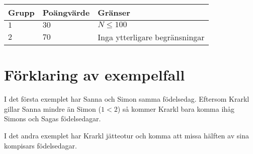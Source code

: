 \noindent
\begin{tabular}{| l | l | l |}
\hline
Grupp & Poängvärde & Gränser \\ \hline
$1$    & $30$         & $N \leq 100$ \\ \hline
$2$    & $70$         & Inga ytterligare begränsningar \\ \hline
\end{tabular}

\section*{Förklaring av exempelfall}
I det första exemplet har Sanna och Simon samma födelsedag.
Eftersom Krarkl gillar Sanna mindre än Simon ($1 < 2$) så kommer Krarkl bara komma ihåg Simons och Sagas födelsedagar.

I det andra exemplet har Krarkl jätteotur och komma att missa hälften av sina kompisars födelsedagar.
